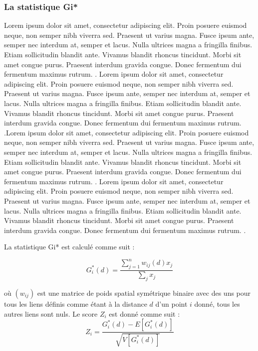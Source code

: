 \medskip

\subsubsection{La statistique Gi*}
\label{subsec-gi-star}
Lorem ipsum dolor sit amet, consectetur adipiscing elit. Proin posuere euismod neque, non semper nibh viverra sed. Praesent ut varius magna. Fusce ipsum ante, semper nec interdum at, semper et lacus. Nulla ultrices magna a fringilla finibus. Etiam sollicitudin blandit ante. Vivamus blandit rhoncus tincidunt. Morbi sit amet congue purus. Praesent interdum gravida congue. Donec fermentum dui fermentum maximus rutrum. \parencite{getis_analysis_1992}. Lorem ipsum dolor sit amet, consectetur adipiscing elit. Proin posuere euismod neque, non semper nibh viverra sed. Praesent ut varius magna. Fusce ipsum ante, semper nec interdum at, semper et lacus. Nulla ultrices magna a fringilla finibus. Etiam sollicitudin blandit ante. Vivamus blandit rhoncus tincidunt. Morbi sit amet congue purus. Praesent interdum gravida congue. Donec fermentum dui fermentum maximus rutrum. \parencite{kalinic_kernel_2018}.Lorem ipsum dolor sit amet, consectetur adipiscing elit. Proin posuere euismod neque, non semper nibh viverra sed. Praesent ut varius magna. Fusce ipsum ante, semper nec interdum at, semper et lacus. Nulla ultrices magna a fringilla finibus. Etiam sollicitudin blandit ante. Vivamus blandit rhoncus tincidunt. Morbi sit amet congue purus. Praesent interdum gravida congue. Donec fermentum dui fermentum maximus rutrum. \parencite{getis_analysis_1992}. Lorem ipsum dolor sit amet, consectetur adipiscing elit. Proin posuere euismod neque, non semper nibh viverra sed. Praesent ut varius magna. Fusce ipsum ante, semper nec interdum at, semper et lacus. Nulla ultrices magna a fringilla finibus. Etiam sollicitudin blandit ante. Vivamus blandit rhoncus tincidunt. Morbi sit amet congue purus. Praesent interdum gravida congue. Donec fermentum dui fermentum maximus rutrum. \parencite{kalinic_kernel_2018}.
\medskip

La statistique Gi* est calculé comme suit \parencite{getis_analysis_1992}:

\medskip

\begin{equation}
    G_i^*(d) = \frac{\sum_{j=1}^n w_{ij}(d)x_j}{\sum_j x_j}
\end{equation}

\medskip
où $(w_{ij})$ est une matrice de poids spatial symétrique binaire avec des uns pour tous les liens définis comme étant à la distance $d$ d'un point $i$ donné, tous les autres liens sont nuls.
\medskip
Le score $Z_i$ est donné comme suit :
\medskip
\begin{equation}
    Z_i = \frac{G_i^*(d) - E [G_i^*(d)]}{\sqrt{V[G_i^*(d)]}}
\end{equation}

